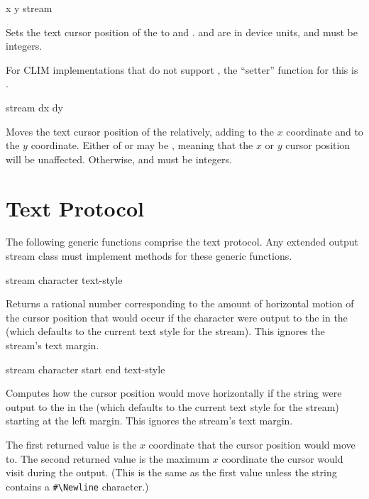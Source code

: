  {x y stream}

Sets the text cursor position of the  
to  and .   and  are in device units, and must be
integers.

For CLIM implementations that do not support , the ``setter'' function
for this is .

 {stream dx dy}

Moves the text cursor position of the  
relatively, adding  to the $x$ coordinate and  to the $y$
coordinate.  Either of  or  may be , meaning that the $x$
or $y$ cursor position will be unaffected.  Otherwise,  and 
must be integers.


\section {Text Protocol}

The following generic functions comprise the text protocol.  Any extended output
stream class must implement methods for these generic functions.

 {stream character \key text-style}

Returns a rational number corresponding to the amount of horizontal motion of
the cursor position that would occur if the character  were
output to the   in the   (which defaults to the current text style for the
stream).  This ignores the stream's text margin.

 {stream character \key start end text-style}

Computes how the cursor position would move horizontally if the string
 were output to the   in
the   (which defaults to the current text style
for the stream) starting at the left margin.  This ignores the stream's text
margin.

The first returned value is the $x$ coordinate that the cursor position would
move to.  The second returned value is the maximum $x$ coordinate the cursor
would visit during the output. (This is the same as the first value unless the
string contains a \verb+#\Newline+ character.)

